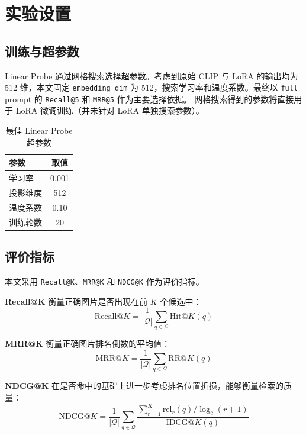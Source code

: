 \documentclass[11pt, a4paper]{ctexart}
\begin{document}
\section{实验设置}

\subsection{训练与超参数}

Linear Probe 通过网格搜索选择超参数。考虑到原始 CLIP 与 LoRA 的输出均为 512 维，本文固定 \texttt{embedding\_dim} 为 512，搜索学习率和温度系数。最终以 \texttt{full} prompt 的 \texttt{Recall@5} 和 \texttt{MRR@5} 作为主要选择依据。
网格搜索得到的参数将直接用于 LoRA 微调训练（并未针对 LoRA 单独搜索参数）。


\begin{table}[!htbp]
    \centering
    \caption{最佳 Linear Probe 超参数}
    \label{tab:hyperparams}
    \begin{tabular}{lc}
        \toprule
        \textbf{参数} & \textbf{取值} \\
        \midrule
        学习率 & 0.001 \\
        投影维度 & 512 \\
        温度系数 & 0.10 \\
        训练轮数 & 20 \\
        \bottomrule
    \end{tabular}
\end{table}

\subsection{评价指标}

本文采用 \texttt{Recall@K}、\texttt{MRR@K} 和 \texttt{NDCG@K} 作为评价指标。

\textbf{Recall@K} 衡量正确图片是否出现在前 $K$ 个候选中：
\begin{equation}
    \mathrm{Recall}@K = \frac{1}{|\mathcal{Q}|}\sum_{q \in \mathcal{Q}} \mathrm{Hit}@K(q)
\end{equation}

\textbf{MRR@K} 衡量正确图片排名倒数的平均值：
\begin{equation}
    \mathrm{MRR}@K = \frac{1}{|\mathcal{Q}|}\sum_{q \in \mathcal{Q}} \mathrm{RR}@K(q)
\end{equation}

\textbf{NDCG@K} 在是否命中的基础上进一步考虑排名位置折损，能够衡量检索的质量：
\begin{equation}
    \mathrm{NDCG}@K = \frac{1}{|\mathcal{Q}|}\sum_{q \in \mathcal{Q}}
    \frac{\sum_{r=1}^{K}\mathrm{rel}_r(q)/\log_2(r+1)}{\mathrm{IDCG}@K(q)}
\end{equation}
\end{document}
